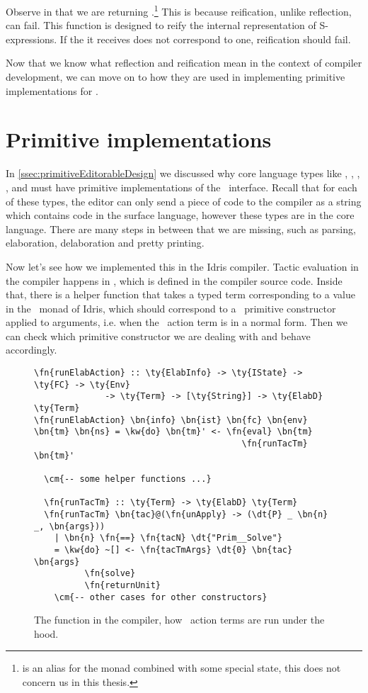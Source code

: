 Observe in  that we are returning
.\footnote{ is an alias for the  monad
combined with some special state, this does not concern us in this thesis.}
This is because reification, unlike reflection, can fail. This function is
designed to reify the internal representation of S-expressions. If the
 it receives does not correspond to one, reification should fail.

Now that we know what reflection and reification mean in the context of compiler
development, we can move on to how they are used in implementing primitive
implementations for .

\section{Primitive  implementations}\label{sec:primitiveEditorableImpl}

In \autoref{ssec:primitiveEditorableDesign} we discussed why core language
types like , , , , and
 must have primitive implementations of the
\Editorable\ interface. Recall that for each of these types, the editor can
only send a piece of code to the compiler as a string which contains code in
the surface language, however these types are in the core language. There are
many steps in between that we are missing, such as parsing, elaboration,
delaboration and pretty printing.

Now let's see how we implemented this in the Idris compiler. Tactic evaluation
in the compiler happens in , which is defined in the compiler
source code. Inside that, there is a helper function  that takes a
typed term corresponding to a value in the \Elab\ monad of Idris, which should
correspond to a \Elab\ primitive constructor applied to arguments, i.e. when
the \Elab\ action term is in a normal form. Then we can check which primitive
constructor we are dealing with and behave accordingly.

\begin{figure}[H]
\caption{The  function in the compiler, how \Elab\ action terms are run under the hood.}
\label{code:runElabAction}
\begin{Verbatim}[framesep=2mm, label=\footnotesize{\normalfont{Haskell}}, labelposition=topline]
\fn{runElabAction} :: \ty{ElabInfo} -> \ty{IState} -> \ty{FC} -> \ty{Env}
              -> \ty{Term} -> [\ty{String}] -> \ty{ElabD} \ty{Term}
\fn{runElabAction} \bn{info} \bn{ist} \bn{fc} \bn{env} \bn{tm} \bn{ns} = \kw{do} \bn{tm}' <- \fn{eval} \bn{tm}
                                         \fn{runTacTm} \bn{tm}'

  \cm{-- some helper functions ...}

  \fn{runTacTm} :: \ty{Term} -> \ty{ElabD} \ty{Term}
  \fn{runTacTm} \bn{tac}@(\fn{unApply} -> (\dt{P} _ \bn{n} _, \bn{args}))
    | \bn{n} \fn{==} \fn{tacN} \dt{"Prim__Solve"}
    = \kw{do} ~[] <- \fn{tacTmArgs} \dt{0} \bn{tac} \bn{args}
          \fn{solve}
          \fn{returnUnit}
    \cm{-- other cases for other constructors}
\end{Verbatim}
\end{figure}

